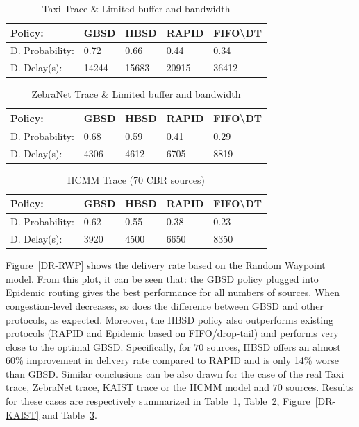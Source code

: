\begin{table}[!h]
\renewcommand{\arraystretch}{1.1}
\caption{Taxi Trace \& Limited buffer and bandwidth}
\centering
\footnotesize
\begin{tabular}{|p{2.5cm}||p{0.9cm}||p{0.9cm}||p{0.9cm}||p{1.5cm}|}
\hline
\bfseries Policy: & GBSD & HBSD & RAPID & FIFO\textbackslash DT\\
\hline\hline
D. Probability:&0.72 &0.66 &0.44 &0.34\\
\hline\hline
D. Delay(s):&14244&15683&20915&36412\\
\hline
\end{tabular}
\label{T-LB+LB}
\end{table}

\begin{table}[!h]
\renewcommand{\arraystretch}{1.1}
\caption{ZebraNet Trace \& Limited buffer and bandwidth}
\centering
\footnotesize
\begin{tabular}{|p{2.5cm}||p{0.9cm}||p{0.9cm}||p{0.9cm}||p{1.5cm}|}
\hline
\bfseries Policy: & GBSD & HBSD & RAPID & FIFO\textbackslash DT\\
\hline\hline
D. Probability:&0.68&0.59&0.41&0.29\\
\hline\hline
D. Delay(s):&4306&4612&6705&8819\\
\hline
\end{tabular}
\label{ZebraNetResults}
\end{table}


\begin{table}[!h]
\renewcommand{\arraystretch}{1.1}
\caption{HCMM Trace (70 CBR sources)}
\centering
\footnotesize
\begin{tabular}{|p{1.8cm}|p{0.9cm}|p{0.9cm}|p{0.9cm}|p{1.5cm}|}
\hline
\bfseries Policy: & GBSD & HBSD & RAPID & FIFO\textbackslash DT\\
\hline
D. Probability:&0.62&0.55&0.38&0.23\\
\hline
D. Delay(s):&3920&4500&6650&8350\\
\hline
\end{tabular}
\label{HCMM-Results}
\end{table}

Figure~\ref{DR-RWP} shows the delivery rate based on the Random Waypoint model. From this plot, it can be seen that: the GBSD policy plugged into Epidemic routing gives the best performance for all numbers of sources. When congestion-level decreases, so does the difference between GBSD and other protocols, as expected. Moreover, the HBSD policy also outperforms existing protocols (RAPID and Epidemic based on FIFO/drop-tail) and performs very close to the optimal GBSD. Specifically, for $70$ sources, HBSD offers an almost 60\% improvement in delivery rate compared to RAPID and is only 14\% worse than GBSD. Similar conclusions can be also drawn for the case of the real Taxi trace,  ZebraNet trace, KAIST trace or the HCMM model and $70$ sources. Results for these cases are respectively summarized in Table~\ref{T-LB+LB}, Table~\ref{ZebraNetResults}, Figure~\ref{DR-KAIST} and Table~\ref{HCMM-Results}.

